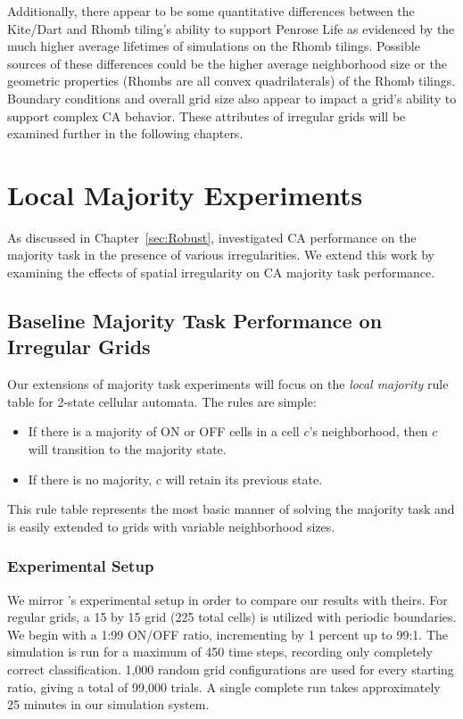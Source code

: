 \documentclass[a4paper,11pt,twoside]{report}
\begin{document}
Additionally, there appear to be some quantitative differences between the Kite/Dart and Rhomb tiling's ability to support Penrose Life as evidenced by the much higher average lifetimes of simulations on the Rhomb tilings. Possible sources of these differences could be the higher average neighborhood size or the geometric properties (Rhombs are all convex quadrilaterals) of the Rhomb tilings. Boundary conditions and overall grid size also appear to impact a grid's ability to support complex CA behavior. These attributes of irregular grids will be examined further in the following chapters.

\processdelayedfloats


\chapter{Local Majority Experiments}
\label{ch:local_maj}

As discussed in Chapter~\ref{sec:Robust}, \citeauthor{me07} investigated CA performance on the majority task in the presence of various irregularities. We extend this work by examining the effects of spatial irregularity on CA majority task performance.

\section{Baseline Majority Task Performance on Irregular Grids}

Our extensions of majority task experiments will focus on the \textit{local majority} rule table for 2-state cellular automata. The rules are simple:

\begin{itemize}
\item If there is a majority of ON or OFF cells in a cell $c$'s neighborhood, then $c$ will transition to the majority state.
\item If there is no majority, $c$ will retain its previous state.
\end{itemize}

This rule table represents the most basic manner of solving the majority task and is easily extended to grids with variable neighborhood sizes.

\subsection*{Experimental Setup}
We mirror \citeauthor{me07}'s experimental setup in order to compare our results with theirs. For regular grids, a 15 by 15 grid (225 total cells) is utilized with periodic boundaries. We begin with a 1:99 ON/OFF ratio, incrementing by 1 percent up to 99:1. The simulation is run for a maximum of 450 time steps, recording only completely correct classification. 1,000 random grid configurations are used for every starting ratio, giving a total of 99,000 trials. A single complete run takes approximately 25 minutes in our simulation system.
\end{document}
